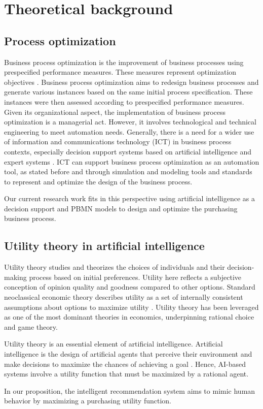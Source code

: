 \documentclass[preprint,3p,onecolumn]{elsarticle}
\begin{document}
\section{Theoretical background}
\subsection{Process optimization}
\par Business process optimization is the improvement of business processes using prespecified performance measures. These measures represent optimization objectives \citep{ tsakalidis2017towards}.  Business process optimization aims to redesign business processes and generate various instances based on the same initial process specification. These instances were then assessed according to prespecified performance measures. Given its organizational aspect, the implementation of business process optimization is a managerial act. However, it involves technological and technical engineering to meet automation needs. Generally, there is a need for a wider use of information and communications technology (ICT) in business process contexts, especially decision support systems based on artificial intelligence and expert systems \citep{gunasekaran2002modelling}. ICT can support business process optimization as an automation tool, as stated before and through simulation and modeling tools and standards to represent and optimize the design of the business process.
\par Our current research work fits in this perspective using artificial intelligence as a decision support and PBMN models to design and optimize the purchasing business process.

\subsection{Utility theory in artificial intelligence}
\par Utility theory studies and theorizes the choices of individuals and their decision-making process based on initial preferences. Utility here reflects a subjective conception of opinion quality and goodness compared to other options.  Standard neoclassical economic theory describes utility as a set of internally consistent assumptions about options to maximize utility \citep{ fishburn1968utility}. Utility theory has been leveraged as one of the most dominant theories in economics, underpinning rational choice and game theory.
\par Utility theory is an essential element of artificial intelligence. Artificial intelligence is the design of artificial agents that perceive their environment and make decisions to maximize the chances of achieving a goal \citep{gabriel2020artificial}. Hence, AI-based systems involve a utility function that must be maximized by a rational agent.
\par In our proposition, the intelligent recommendation system aims to mimic human behavior by maximizing a purchasing utility function. 
 
\end{document}

